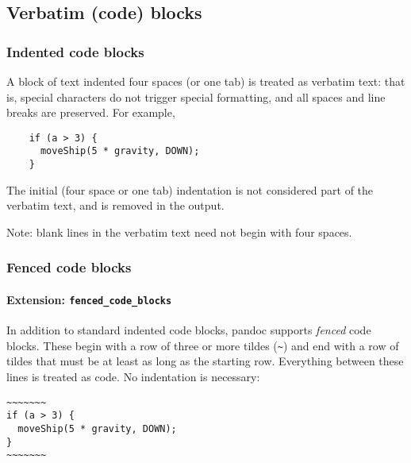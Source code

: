 \hypertarget{verbatim-code-blocks}{%
\subsection{Verbatim (code) blocks}\label{verbatim-code-blocks}}

\hypertarget{indented-code-blocks}{%
\subsubsection{Indented code blocks}\label{indented-code-blocks}}

A block of text indented four spaces (or one tab) is treated as verbatim
text: that is, special characters do not trigger special formatting, and
all spaces and line breaks are preserved. For example,

\begin{verbatim}
    if (a > 3) {
      moveShip(5 * gravity, DOWN);
    }
\end{verbatim}

The initial (four space or one tab) indentation is not considered part
of the verbatim text, and is removed in the output.

Note: blank lines in the verbatim text need not begin with four spaces.

\hypertarget{fenced-code-blocks}{%
\subsubsection{Fenced code blocks}\label{fenced-code-blocks}}

\hypertarget{extension-fenced_code_blocks}{%
\paragraph{\texorpdfstring{Extension:
\texttt{fenced\_code\_blocks}}{Extension: fenced\_code\_blocks}}\label{extension-fenced_code_blocks}}

In addition to standard indented code blocks, pandoc supports
\emph{fenced} code blocks. These begin with a row of three or more
tildes (\texttt{\textasciitilde{}}) and end with a row of tildes that
must be at least as long as the starting row. Everything between these
lines is treated as code. No indentation is necessary:

\begin{verbatim}
~~~~~~~
if (a > 3) {
  moveShip(5 * gravity, DOWN);
}
~~~~~~~
\end{verbatim}

